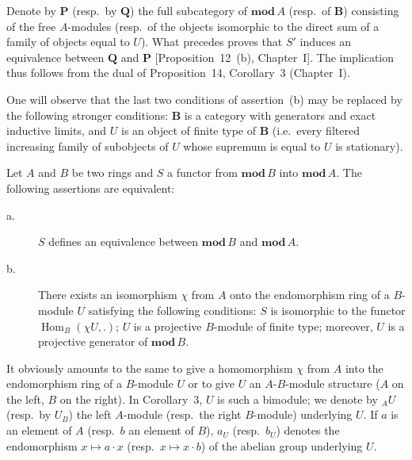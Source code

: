 Denote by $\mathbf P$ (resp.\ by $\mathbf Q$) the full subcategory of
$\mathbf{mod}\,A$ (resp.\ of $\mathbf B$) consisting of the free
$A$-modules (resp.\ of the objects isomorphic to the direct sum of a
family of objects equal to $U$).  What precedes proves that $S'$
induces an equivalence between $\mathbf Q$ and $\mathbf P$
[Proposition~12~(b), Chapter~I].  The implication thus follows from the
dual of Proposition~14, Corollary~3 (Chapter~I).

One will observe that the last two conditions of assertion~(b) may be
replaced by the following stronger conditions: $\mathbf B$ is a
category with generators and exact inductive limits, and $U$ is an
object of finite type of $\mathbf B$ (i.e.\ every filtered increasing
family of subobjects of $U$ whose supremum is equal to $U$ is
stationary).

\begin{corollary}
Let $A$ and $B$ be two rings and $S$ a functor from $\mathbf{mod}\,B$
into $\mathbf{mod}\,A$.  The following assertions are equivalent:
\begin{description}
\item[\normalfont a.] $S$ defines an equivalence between
      $\mathbf{mod}\,B$ and $\mathbf{mod}\,A$.
\item[\normalfont b.] There exists an isomorphism $\chi$ from $A$ onto
      the endomorphism ring of a $B$-module $U$ satisfying the
      following conditions: $S$ is isomorphic to the functor
      $\operatorname{Hom}_B(\chi U,.)$; $U$ is a projective $B$-module
      of finite type; moreover, $U$ is a projective generator of
      $\mathbf{mod}\,B$.
\end{description}
\end{corollary}

It obviously amounts to the same to give a homomorphism $\chi$ from
$A$ into the endomorphism ring of a $B$-module $U$ or to give $U$ an
$A$-$B$-module structure ($A$ on the left, $B$ on the right).  In
Corollary~3, $U$ is such a bimodule; we denote by ${}_AU$ (resp.\ by
$U_B$) the left $A$-module (resp.\ the right $B$-module) underlying
$U$.  If $a$ is an element of $A$ (resp.\ $b$ an element of $B$),
$a_U$ (resp.\ $b_U$) denotes the endomorphism $x\mapsto a\cdot x$
(resp.\ $x\mapsto x\cdot b$) of the abelian group underlying $U$.

